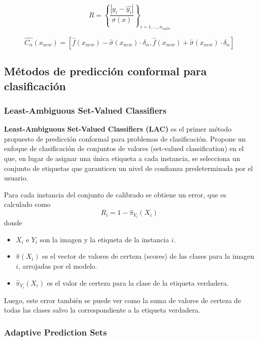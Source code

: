$$
R = \left\{ 
        \frac{| y_i - \hat{y_i} |}{\sigma(x)} 
    \right\}_{i=1,...,n_{calib}}
$$


$$
\hat{C_\alpha}(x_{new}) = 
    \left[ 
        \hat{f}(x_{new})- \hat{\sigma}(x_{new}) \cdot \delta_\alpha, 
        \hat{f}(x_{new})+ \hat{\sigma}(x_{new}) \cdot \delta_\alpha
    \right]
$$




\subsection{Métodos de predicción conformal para clasificación}


\subsubsection{Least-Ambiguous Set-Valued Classifiers}

\textbf{Least-Ambiguous Set-Valued Classifiers (LAC)} es el primer método propuesto de predicción conformal 
para problemas de clasificación. Propone un enfoque de clasificación de conjuntos de valores 
(set-valued classification) en el que, en lugar de asignar una única etiqueta a cada instancia, se selecciona 
un conjunto de etiquetas que garanticen un nivel de confianza predeterminada por el usuario.

Para cada instancia del conjunto de calibrado se obtiene un error, que es calculado como
$$
R_i = 1 - \hat{\pi}_{Y_i}(X_i)
$$
donde
\begin{itemize}
    \item $X_i$ e $Y_i$ son la imagen y la etiqueta de la instancia $i$.
    \item $\hat{\pi}(X_i)$ es el vector de valores de certeza (scores) de las clases para la imagen $i$, 
    arrojadas por el modelo.
    \item $\hat{\pi}_{Y_i}(X_i)$ es el valor de certeza para la clase de la etiqueta verdadera.
\end{itemize}

Luego, este error también se puede ver como la suma de valores de certeza de todas las clases salvo la 
correspondiente a la etiqueta verdadera.




\subsubsection{Adaptive Prediction Sets}

